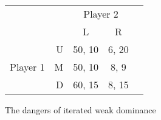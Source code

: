 \begin{enumerate}
\begin{figure}[h]
\begin{center}
\begin{tabular}{crccc}
& & \multicolumn{2}{c}{Player 2} \\ [.15cm] & & L & R \\
\cline{3-4} \multirow{3}{1.5cm}{Player 1} & U &
\multicolumn{1}{|c|}{50, 10} & \multicolumn{1}{c|}{6, 20} \\
\cline{3-4} & M & \multicolumn{1}{|c|}{50, 10} &
\multicolumn{1}{c|}{8, 9} \\ \cline{3-4} & D &
\multicolumn{1}{|c|}{60, 15} & \multicolumn{1}{c|}{8, 15} \\
\cline{3-4}
\end{tabular}
\end{center}
\caption{The dangers of iterated weak dominance}
\label{fig:weakdom} %
\end{figure}

\end{enumerate}








